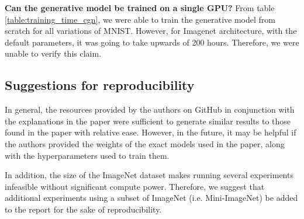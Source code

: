 \textbf{Can the generative model be trained on a single GPU?} From table \ref{table:training_time_cgn}, we were able to train the generative model from scratch for all variations of MNIST. However, for Imagenet architecture, with the default parameters, it was going to take upwards of 200 hours. Therefore, we were unable to verify this claim.


\subsection{Suggestions for reproducibility}
In general, the resources provided by the authors on GitHub in conjunction with the explanations in the paper were sufficient to generate similar results to those found in the paper with relative ease. However, in the future, it may be helpful if the authors provided the weights of the exact models used in the paper, along with the hyperparameters used to train them.

In addition, the size of the ImageNet dataset makes running several experiments infeasible without significant compute power. Therefore, we suggest that additional experiments using a subset of ImageNet (i.e. Mini-ImageNet) be added to the report for the sake of reproducibility.
